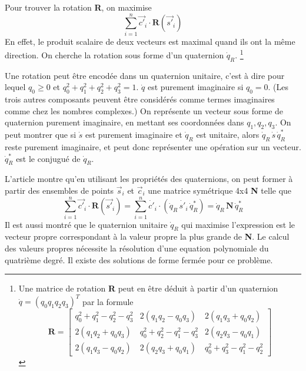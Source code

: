 \documentclass[a4paper,10pt]{scrreprt}
\begin{document}
Pour trouver la rotation \textbf{R}, on maximise
\begin{equation}
	\sum_{i=1}^{n} \vec{c'}_{i} \cdot \mathbf{R}(\vec{s'}_i)
\end{equation}
En effet, le produit scalaire de deux vecteurs est maximal quand ils ont la même direction. On cherche la rotation sous forme d'un quaternion $\dot{q}_R$.
\footnote{Une matrice de rotation \textbf{R} peut en être déduit à partir d'un quaternion $\dot{q} = (q_0 q_1 q_2 q_3)^T$ par la formule
\begin{equation}
	\mathbf{R} = \begin{bmatrix}
		q_0^2 + q_1^2 - q_2^2 - q_3^2 & 2(q_1 q_2 - q_0 q_3) & 2(q_1 q_3 + q_0 q_2) \\
		2(q_1 q_2 + q_0 q_3) & q_0^2 + q_2^2 - q_1^2 - q_3^2 & 2(q_2 q_3 - q_0 q_1) \\
		2(q_1 q_3 - q_0 q_2) & 2(q_2 q_3 + q_0 q_1) & q_0^2 + q_3^2 - q_1^2 - q_2^2
	\end{bmatrix}
\end{equation}}

Une rotation peut être encodée dans un quaternion unitaire, c'est à dire pour lequel $q_0 \geq 0$ et $q_0^2 + q_1^2 + q_2^2 + q_3^2 = 1$. $\dot{q}$ est purement imaginaire si $q_0 = 0$. (Les trois autres composants peuvent être considérés comme termes imaginaires comme chez les nombres complexes.) On représente un vecteur sous forme de quaternion purement imaginaire, en mettant ses coordonnées dans $q_1, q_2, q_3$. On peut montrer que si $\dot{s}$ est purement imaginaire et $\dot{q}_R$ est unitaire, alors $\dot{q}_R \, \dot{s} \, \dot{q}^*_R$ reste purement imaginaire, et peut donc représenter une opération sur un vecteur. $\dot{q}^*_R$ est le conjugué de $\dot{q}_R$.

L'article \cite{Horn1986} montre qu'en utilisant les propriétés des quaternions, on peut former à partir des ensembles de points $\vec{s}_i$ et $\vec{c}_i$ une matrice symétrique 4x4 \textbf{N} telle que
\begin{equation}
	\sum_{i=1}^{n} \vec{c'}_{i} \cdot \mathbf{R}(\vec{s'}_i) =
	\sum_{i=1}^{n} \dot{c'}_{i} \cdot (\dot{q}_R \, \dot{s'}_{i} \, \dot{q}^*_R) =
	\dot{q}_R \, \mathbf{N} \, \dot{q}^*_R
\end{equation}
Il est aussi montré que le quaternion unitaire $\dot{q}_R$ qui maximise l'expression est le vecteur propre correspondant à la valeur propre la plus grande de \textbf{N}. Le calcul des valeurs propres nécessite la résolution d'une equation polynomiale du quatrième degré. Il existe des solutions de forme fermée pour ce problème.
\end{document}
